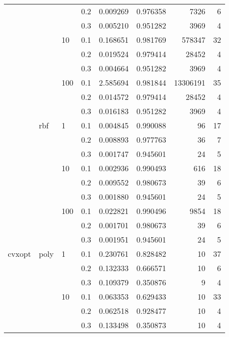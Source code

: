 \begin{table}[H]
\begin{tabular}{llllrrrr}
       &     &     & 0.2 &     0.009269 &  0.976358 &      7326 &     6 \\
       &     &     & 0.3 &     0.005210 &  0.951282 &      3969 &     4 \\
       &     & 10  & 0.1 &     0.168651 &  0.981769 &    578347 &    32 \\
       &     &     & 0.2 &     0.019524 &  0.979414 &     28452 &     4 \\
       &     &     & 0.3 &     0.004664 &  0.951282 &      3969 &     4 \\
       &     & 100 & 0.1 &     2.585694 &  0.981844 &  13306191 &    35 \\
       &     &     & 0.2 &     0.014572 &  0.979414 &     28452 &     4 \\
       &     &     & 0.3 &     0.016183 &  0.951282 &      3969 &     4 \\
       & rbf & 1   & 0.1 &     0.004845 &  0.990088 &        96 &    17 \\
       &     &     & 0.2 &     0.008893 &  0.977763 &        36 &     7 \\
       &     &     & 0.3 &     0.001747 &  0.945601 &        24 &     5 \\
       &     & 10  & 0.1 &     0.002936 &  0.990493 &       616 &    18 \\
       &     &     & 0.2 &     0.009552 &  0.980673 &        39 &     6 \\
       &     &     & 0.3 &     0.001880 &  0.945601 &        24 &     5 \\
       &     & 100 & 0.1 &     0.022821 &  0.990496 &      9854 &    18 \\
       &     &     & 0.2 &     0.001701 &  0.980673 &        39 &     6 \\
       &     &     & 0.3 &     0.001951 &  0.945601 &        24 &     5 \\
cvxopt & poly & 1   & 0.1 &     0.230761 &  0.828482 &        10 &    37 \\
       &     &     & 0.2 &     0.132333 &  0.666571 &        10 &     6 \\
       &     &     & 0.3 &     0.109379 &  0.350876 &         9 &     4 \\
       &     & 10  & 0.1 &     0.063353 &  0.629433 &        10 &    33 \\
       &     &     & 0.2 &     0.062518 &  0.928477 &        10 &     4 \\
       &     &     & 0.3 &     0.133498 &  0.350873 &        10 &     4 \\

\end{tabular}
\end{table}
